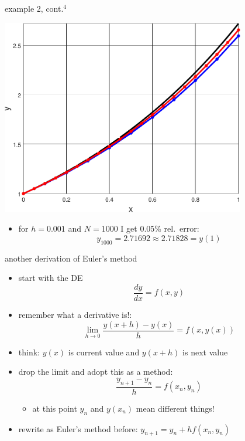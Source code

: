 \documentclass{beamer}
\begin{document}
\begin{frame}{example 2, cont.$^4$}

\begin{center}
\includegraphics[width=0.8\textwidth]{figs/simpleeuler}
\end{center}

\footnotesize
\begin{itemize}
\item for $h=0.001$ and $N=1000$ I get 0.05\% rel.~error:
   $$y_{1000} = 2.71692 \approx 2.71828 = y(1)$$
\end{itemize}
\end{frame}


\begin{frame}{another derivation of Euler's method}

\begin{itemize}
\item start with the DE
    $$\frac{dy}{dx} = f(x,y)$$
\item remember what a derivative is!:
    $$\lim_{h\to 0} \frac{y(x+h)-y(x)}{h} = f(x,y(x))$$
\item think: $y(x)$ is current value and $y(x+h)$ is next value
\item drop the limit and adopt this as a method:
    $$\frac{y_{n+1}-y_n}{h} = f(x_n,y_n)$$

\vspace{-2mm}
    \begin{itemize}
    \item at this point $y_n$ and $y(x_n)$ mean different things!
    \end{itemize}
\item rewrite as Euler's method before:  $y_{n+1} = y_n + h f(x_n,y_n)$
\end{itemize}
\end{frame}
\end{document}
